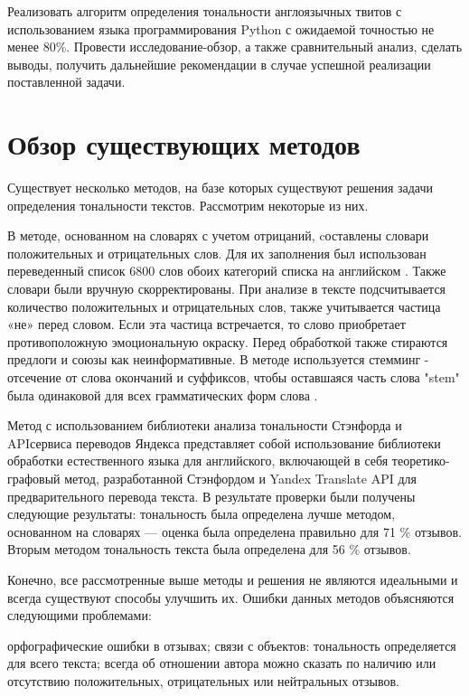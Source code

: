 \documentclass[14pt,a4paper]{scrartcl}
\begin{document}
Реализовать алгоритм определения тональности англоязычных твитов с использованием языка программирования Python с ожидаемой точностью не менее 80\%. Провести исследование-обзор, а также сравнительный анализ, сделать выводы, получить дальнейшие рекомендации в случае успешной реализации поставленной задачи.  
\newpage
\section{Обзор существующих методов}


Существует несколько методов, на базе которых существуют решения задачи определения тональности текстов. Рассмотрим некоторые из них.

В методе, основанном на словарях с учетом отрицаний,            cоставлены словари положительных и отрицательных слов. Для их заполнения был использован переведенный список 6800 слов обоих категорий списка на английском \cite{1}. Также словари были вручную скорректированы. При анализе в тексте подсчитывается количество положительных и отрицательных слов, также учитывается частица «не» перед словом. Если эта частица встречается, то слово приобретает противоположную эмоциональную окраску. Перед обработкой также стираются предлоги и союзы как неинформативные. В методе используется стемминг - отсечение от слова окончаний и суффиксов, чтобы оставшаяся часть слова "stem" была одинаковой для всех грамматических форм слова \cite{2}. 

Метод с использованием библиотеки анализа тональности Стэнфорда и APIсервиса переводов Яндекса представляет собой использование библиотеки обработки естественного языка для английского, включающей в себя теоретико-графовый метод, разработанной Стэнфордом и Yandex Translate API для предварительного перевода текста. В результате проверки были получены следующие результаты: тональность была определена лучше методом, основанном на словарях — оценка была определена правильно для 71 \% отзывов. Вторым методом тональность текста была определена для 56 \% отзывов.

Конечно, все рассмотренные выше методы и решения не являются идеальными и всегда существуют способы улучшить их. Ошибки данных методов объясняются следующими проблемами:
\begin{itemize}
 орфографические ошибки в отзывах;
 связи с объектов: тональность определяется для всего текста;
 всегда об отношении автора можно сказать по наличию или отсутствию положительных, отрицательных или нейтральных отзывов. 
\end{itemize}
\end{document}
